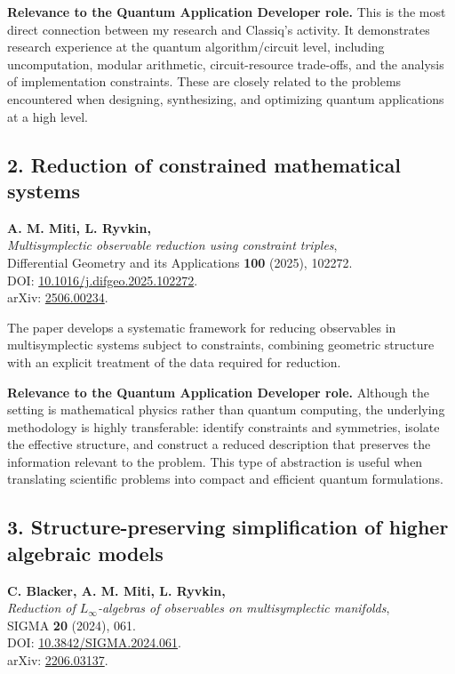\documentclass[10pt,a4paper]{article}
\newcommand{\relevance}[1]{\textbf{Relevance to the Quantum Application Developer role.} #1}
\begin{document}
\relevance{This is the most direct connection between my research and Classiq's activity. It demonstrates research
experience at the quantum algorithm/circuit level, including uncomputation, modular arithmetic, circuit-resource
trade-offs, and the analysis of implementation constraints. These are closely related to the problems encountered when
designing, synthesizing, and optimizing quantum applications at a high level.}

\subsection*{2. Reduction of constrained mathematical systems}

\textbf{A. M. Miti, L. Ryvkin,}\\
\textit{Multisymplectic observable reduction using constraint triples},\\
Differential Geometry and its Applications \textbf{100} (2025), 102272.\\
DOI: \href{https://doi.org/10.1016/j.difgeo.2025.102272}{10.1016/j.difgeo.2025.102272}.\\
arXiv: \href{https://arxiv.org/abs/2506.00234}{2506.00234}.

The paper develops a systematic framework for reducing observables in multisymplectic systems subject to constraints,
combining geometric structure with an explicit treatment of the data required for reduction.

\relevance{Although the setting is mathematical physics rather than quantum computing, the underlying methodology is
highly transferable: identify constraints and symmetries, isolate the effective structure, and construct a reduced
description that preserves the information relevant to the problem. This type of abstraction is useful when translating
scientific problems into compact and efficient quantum formulations.}

\subsection*{3. Structure-preserving simplification of higher algebraic models}

\textbf{C. Blacker, A. M. Miti, L. Ryvkin,}\\
\textit{Reduction of $L_\infty$-algebras of observables on multisymplectic manifolds},\\
SIGMA \textbf{20} (2024), 061.\\
DOI: \href{https://doi.org/10.3842/SIGMA.2024.061}{10.3842/SIGMA.2024.061}.\\
arXiv: \href{https://arxiv.org/abs/2206.03137}{2206.03137}.
\end{document}
